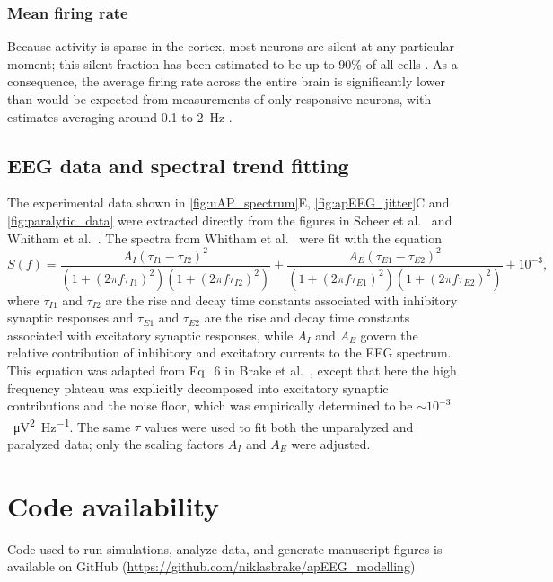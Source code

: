\subsubsection{Mean firing rate}
Because activity is sparse in the cortex, most neurons are silent at any particular moment; this silent fraction has been estimated to be up to 90\% of all cells \cite{Shoham2006}. As a consequence, the average firing rate across the entire brain is significantly lower than would be expected from measurements of only responsive neurons, with estimates averaging around 0.1 to 2~\unit{\hertz} \cite{Kerr2005, Shoham2006, Barth2012}.

\subsection{EEG data and spectral trend fitting}
The experimental data shown in \autoref{fig:uAP_spectrum}E, {\ref{fig:apEEG_jitter}C} and {\ref{fig:paralytic_data}} were extracted directly from the figures in Scheer et al.~\cite{Scheer2006} and Whitham et al.~\cite{Whitham2007}. The spectra from Whitham et al.~\cite{Whitham2007} were fit with the equation
\begin{equation} \label{eq:syn_timescales}
S(f) = \frac{A_I(\tau_{I1}-\tau_{I2})^2}{(1+(2\pi f\tau_{I1})^2)(1+(2\pi f\tau_{I2})^2)}+\frac{A_E(\tau_{E1}-\tau_{E2})^2}{(1+(2\pi f\tau_{E1})^2)(1+(2\pi f\tau_{E2})^2)}+10^{-3},
\end{equation}
where $\tau_{I1}$ and $\tau_{I2}$ are the rise and decay time constants associated with inhibitory synaptic responses and $\tau_{E1}$ and $\tau_{E2}$ are the rise and decay time constants associated with excitatory synaptic responses, while $A_I$ and $A_E$ govern the relative contribution of inhibitory and excitatory currents to the EEG spectrum. This equation was adapted from Eq.~6 in Brake et al.~\cite{Brake2024}, except that here the high frequency plateau was explicitly decomposed into excitatory synaptic contributions and the noise floor, which was empirically determined to be ${\sim}10^{-3}$~\unit{{\micro\volt^2\hertz^{-1}}}. The same $\tau$ values were used to fit both the unparalyzed and paralyzed data; only the scaling factors $A_I$ and $A_E$ were adjusted. 

\section{Code availability}
Code used to run simulations, analyze data, and generate manuscript figures is available on GitHub (\url{https://github.com/niklasbrake/apEEG_modelling})

